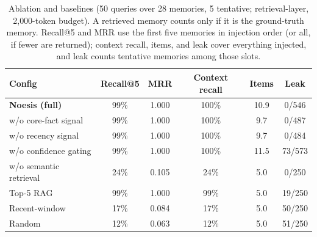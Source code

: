 \begin{table}[ht]
\centering
\caption{Ablation and baselines (50 queries over 28 memories, 5 tentative; retrieval-layer, 2{,}000-token budget). A retrieved memory counts only if it is the ground-truth memory. Recall@5 and MRR use the first five memories in injection order (or all, if fewer are returned); context recall, items, and leak cover everything injected, and leak counts tentative memories among those slots.}
\label{tab:ablation}
\begin{tabular}{lccccc}
\toprule
\textbf{Config} & \textbf{Recall@5} & \textbf{MRR} & \textbf{Context recall} & \textbf{Items} & \textbf{Leak} \\
\midrule
\textbf{Noesis (full)} & 99\% & 1.000 & 100\% & 10.9 & 0/546 \\
w/o core-fact signal & 99\% & 1.000 & 100\% & 9.7 & 0/487 \\
w/o recency signal & 99\% & 1.000 & 100\% & 9.7 & 0/484 \\
w/o confidence gating & 99\% & 1.000 & 100\% & 11.5 & 73/573 \\
w/o semantic retrieval & 24\% & 0.105 & 24\% & 5.0 & 0/250 \\
\midrule
Top-5 RAG & 99\% & 1.000 & 99\% & 5.0 & 19/250 \\
Recent-window & 17\% & 0.084 & 17\% & 5.0 & 50/250 \\
Random & 12\% & 0.063 & 12\% & 5.0 & 51/250 \\
\bottomrule
\end{tabular}
\end{table}
